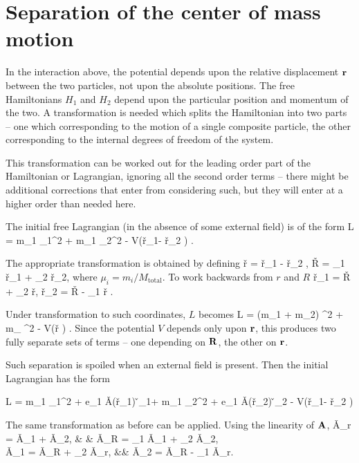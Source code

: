  
\section{Separation of the center of mass motion}
In the interaction above, the potential depends upon the relative displacement $\mathbf{r}$ between the two particles, not upon the absolute positions.  The free Hamiltonians $H_1$ and $H_2$ depend upon the particular position and momentum of the two.  A transformation is needed which splits the Hamiltonian into two parts -- one which corresponding to the motion of a single composite particle, the other corresponding to the internal degrees of freedom of the system.

This transformation can be worked out for the leading order part of the Hamiltonian or Lagrangian, ignoring all the second order terms -- there might be additional corrections that enter from considering such, but they will enter at a higher order than needed here.

The initial free Lagrangian (in the absence of some external field) is of the form
\beq
	L =  m_1 _1^2   +  m_1 _2^2 - V(\v{r_1}- \v{r_2} )	. 
\eeq

The appropriate transformation is obtained by defining
\beq
	\v{r} = \v{r}_1 - \v{r}_2 , \hspace{4em}   \v{R} = \mu_1 \v{r}_1 + \mu_2 \v{r}_2,
\eeq 
where $\mu_i = m_i / M_\text{total}$. 
To work backwards from $r$ and $R$
\beq
	\v{r}_1 = \v{R} + \mu_2 \v{r},  \hspace{4em} \v{r}_2 = \v{R} - \mu_1 \v{r} .
\eeq

Under transformation to such coordinates, $L$ becomes
\beq
		L =  (m_1 + m_2) ^2   +  m_ ^2 - V(\v{r} ) . 
\eeq
Since the potential $V$ depends only upon $\mathbf{r}$, this produces two fully separate sets of terms -- one depending on $\mathbf{R}$, the other on $\mathbf{r}$.

Such separation is spoiled when an external field is present.  Then the initial Lagrangian has the form

\beq
	L =  m_1 _1^2  + e_1 \v{A}(\v{r}_1) \cdot \v{}_1+  m_1 _2^2 +  e_1 \v{A}(\v{r}_2) \cdot \v{}_2  - V(\v{r_1}- \v{r_2} )	 
\eeq

The same transformation as before can be applied.  Using the linearity of $\mathbf{A}$, 
\beqa
	\v{A}_r = \v{A}_1 + \v{A}_2, & \hspace{4em}& \v{A}_R = \mu_1 \v{A}_1 + \mu_2 \v{A}_2,	\\
		\v{A}_1 = \v{A}_R + \mu_2 \v{A}_r,  &\hspace{4em}& \v{A}_2 = \v{A}_R - \mu_1 \v{A}_r.
\eeqa

